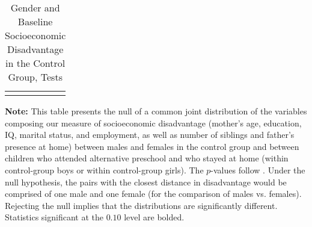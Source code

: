 \clearpage

\begin{table}[!htpb]
\begin{threeparttable}
\caption{Gender and Baseline Socioeconomic Disadvantage in the Control Group, Tests} \label{table:disadtests}
\centering
\begin{tabularx}{16.5cm}{XcX}
&  &
\end{tabularx}
\begin{tablenotes}
\footnotesize
\item \textbf{Note:} This table presents the null of a common joint distribution of the variables composing our measure of socioeconomic disadvantage (mother's age, education, IQ, marital status, and employment, as well as number of siblings and father's presence at home) between males and females in the control group and between children who attended  alternative preschool and who stayed at home (within control-group boys or within control-group girls). The $p$-values follow \citet{Rosenbaum_2005_Distribution_JRSS}. Under the null hypothesis, the pairs with the closest distance in disadvantage would be comprised of one male and one female (for the comparison of males vs. females). Rejecting the null implies that the distributions are significantly different. Statistics significant at the $0.10$ level are bolded.
\end{tablenotes}
\end{threeparttable}
\end{table}





